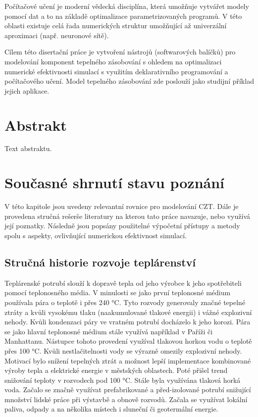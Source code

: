 Počítačové učení je moderní vědecká disciplína, která umožňuje vytvářet modely
pomocí dat a to na základě optimalizace parametrizovaných programů. V této
oblasti existuje celá řada numerických struktur umožňující až univerzální
aproximaci (např. neuronové sítě).

Cílem této disertační práce je vytvoření nástrojů (softwarových balíčků) pro
modelování komponent tepelného zásobování s ohledem na optimalizaci numerické
efektivnosti simulací s využitím deklarativního programování a počítačového
učení. Model tepelného zásobování zde poslouží jako studijní příklad jejich
aplikace.

\chapter{Abstrakt}
\label{abstrakt}
Text abstraktu.

\chapter{Současné shrnutí stavu poznání}
\label{struktura}
V této kapitole jsou uvedeny relevantní rovnice pro modelování CZT. Dále je
provedena stručná rešerše literatury na kterou tato práce navazuje, nebo
využívá její poznatky. Následně jsou popsány použitelné výpočetní přístupy
a metody spolu s aspekty, ovlivňující numerickou efektivnost simulací.

\section{Stručná historie rozvoje teplárenství}
\label{sec:history}
Teplárenské potrubí slouží k dopravě tepla od jeho výrobce k jeho spotřebiteli
pomocí teplonosného média. V minulosti se jako první teplonosné médium
používala pára o teplotě i přes 240 °C. Tyto rozvody generovaly značné tepelné
ztráty a kvůli vysokému tlaku (naakumulované tlakové energii) i vážné
explozivní nehody. Kvůli kondenzaci páry ve vratném potrubí docházelo k jeho
korozi. Pára se jako hlavní teplonosné médium stále využívá například v Paříži
či Manhattanu. Nástupce tohoto provedení využíval tlakovou horkou vodu o
teplotě přes 100 °C. Kvůli nestlačitelnosti vody se výrazně omezily explozivní
nehody.
Motivací bylo snížení tepelných ztrát a možnost lepší implementace kombinované
výroby tepla a elektrické energie v městských oblastech. Poté přišel trend
snižování teploty v rozvodech pod 100 °C. Stále byla využívána tlaková horká
voda. Začalo se značně využívat prefabrikované a před-izolované potrubí
snižující množství lidské práce při výstavbě a obnově rozvodů. Začala se
využívat lokální paliva, odpady a na několika místech i sluneční či geotermální
energie.

